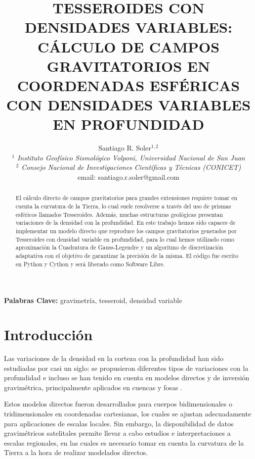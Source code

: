 \documentclass[a4paper,10pt]{article}
\title{
    \textbf{
    TESSEROIDES CON DENSIDADES VARIABLES:
    CÁLCULO DE CAMPOS GRAVITATORIOS EN COORDENADAS ESFÉRICAS CON
    DENSIDADES VARIABLES EN PROFUNDIDAD
    }
}
\author{
    Santiago R. Soler$^{1,2}$ \vspace{0.5em} \\ 
    \normalsize{\textit{$^1$ Instituto Geofísico Sismológico Volponi, Universidad Nacional de San Juan}} \\
    \normalsize{\textit{$^2$ Consejo Nacional de Investigaciones Científicas y Técnicas (CONICET)}} \vspace{0.4em} \\
    \normalsize{email: santiago.r.soler@gmail.com}
}
\date{}
\begin{document}
\renewcommand{\tablename}{Tabla}

\maketitle

\vspace{-2.5em}
\begin{center}
\textbf{Palabras Clave:} gravimetría, tesseroid, densidad variable
\end{center}
\vspace{0.5em}

\begin{abstract}
El cálculo directo de campos gravitatorios para grandes extensiones requiere tomar en cuenta la curvatura de la Tierra, lo cual suele resolverse a través del uso de prismas esféricos llamados Tesseroides.
Además, muchas estructuras geológicas presentan variaciones de la densidad con la profundidad.
En este trabajo hemos sido capaces de implementar un modelo directo que reproduce los campos gravitatorios generados por Tesseroides con densidad variable en profundidad, para lo cual hemos utilizado como aproximación la Cuadratura de Gauss-Legendre y un algoritmo de discretización adaptativa con el objetivo de garantizar la precisión de la misma.
El código fue escrito en Python y Cython y será liberado como Software Libre.

\end{abstract}


\section{Introducción}

Las variaciones de la densidad en la corteza con la profundidad han sido estudiadas por casi un siglo: se propusieron diferentes tipos de variaciones con la profundidad \citep{Athy1930, Maxant1980, Rao1986, Rao1993, Rao1994} e incluso se han tenido en cuenta en modelos directos y de inversión gravimétrica, principalmente aplicados en cuencas y fosas \citep{Cordell1973, Rao1986, Cowie1990, Rao1993, Rao1994, Zhang2001, Welford2010}.

Estos modelos directos fueron desarrollados para cuerpos bidimensionales o tridimensionales en coordenadas cartesianas, los cuales se ajustan adecuadamente para aplicaciones de escalas locales.
Sin embargo, la disponibilidad de datos gravimétricos satelitales permite llevar a cabo estudios e interpretaciones a escalas regionales, en las cuales es necesario tomar en cuenta la curvatura de la Tierra a la hora de realizar modelados directos. 
\end{document}
